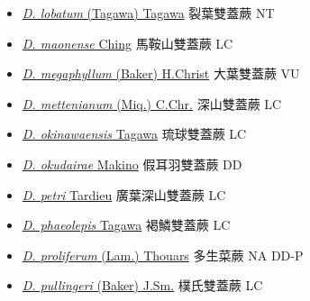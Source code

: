 \begin{itemize}
\begin{itemize}
        \item[] \href{http://www.theplantlist.org/tpl1.1/search?q=Diplazium+lobatum}{\textit{D. lobatum} (Tagawa) Tagawa}   裂葉雙蓋蕨   NT
        \item[] \href{http://www.theplantlist.org/tpl1.1/search?q=Diplazium+maonense}{\textit{D. maonense} Ching}   馬鞍山雙蓋蕨   LC
        \item[] \href{http://www.theplantlist.org/tpl1.1/search?q=Diplazium+megaphyllum}{\textit{D. megaphyllum} (Baker) H.Christ}   大葉雙蓋蕨   VU
        \item[] \href{http://www.theplantlist.org/tpl1.1/search?q=Diplazium+mettenianum}{\textit{D. mettenianum} (Miq.) C.Chr.}   深山雙蓋蕨   LC
        \item[] \href{http://www.theplantlist.org/tpl1.1/search?q=Diplazium+okinawaensis}{\textit{D. okinawaensis} Tagawa}   琉球雙蓋蕨   LC
        \item[] \href{http://www.theplantlist.org/tpl1.1/search?q=Diplazium+okudairae}{\textit{D. okudairae} Makino}   假耳羽雙蓋蕨   DD
        \item[] \href{http://www.theplantlist.org/tpl1.1/search?q=Diplazium+petri}{\textit{D. petri} Tardieu}   廣葉深山雙蓋蕨   LC
        \item[] \href{http://www.theplantlist.org/tpl1.1/search?q=Diplazium+phaeolepis}{\textit{D. phaeolepis} Tagawa}   褐鱗雙蓋蕨   LC
        \item[] \href{http://www.theplantlist.org/tpl1.1/search?q=Diplazium+proliferum}{\textit{D. proliferum} (Lam.) Thouars}   多生菜蕨   NA DD-P
        \item[] \href{http://www.theplantlist.org/tpl1.1/search?q=Diplazium+pullingeri}{\textit{D. pullingeri} (Baker) J.Sm.}   樸氏雙蓋蕨   LC

\end{itemize}
\end{itemize}
